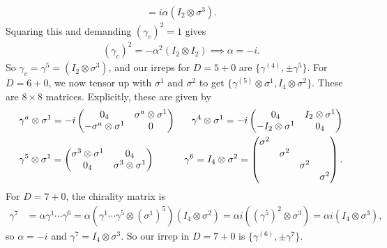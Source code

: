 \documentclass[11pt]{article}
\begin{document}
\begin{eexample}
\begin{align*}
        = i \alpha (I_2 \otimes \sigma^3).
    \end{align*}
    Squaring this and demanding $(\gamma_c)^2 = 1$ gives
    \begin{align*}
        (\gamma_c)^2 = - \alpha^2 (I_2 \otimes I_2) \implies \alpha = - i.
    \end{align*}
    So $\gamma_c = \gamma^5 = (I_2 \otimes \sigma^3)$, and our irreps
    for $D = 5 + 0$ are $\{ \gamma^{(4)}, \pm \gamma^5\}$.
    For $D = 6 + 0$, we now tensor up with $\sigma^1$ and $\sigma^2$ to get
    $\{ \gamma^{(5)} \otimes \sigma^1, I_4 \otimes \sigma^2 \}$.
    These are $8 \times 8$ matrices. Explicitly, these are given by
    \begin{align*}
        & \gamma^a \otimes \sigma^1 = -i \begin{pmatrix}
            0_4 & \sigma^a \otimes \sigma^1\\
            - \sigma^a \otimes \sigma^1 & 0
        \end{pmatrix}
        & \gamma^4 \otimes \sigma^1 = - i \begin{pmatrix}
            0_4 & I_2 \otimes \sigma^1\\
            - I_2 \otimes \sigma^1 & 0_4
        \end{pmatrix}\\
        & \gamma^5 \otimes \sigma^1 = \begin{pmatrix}
            \sigma^3 \otimes \sigma^1 & 0_4\\
            0_4 & \sigma^3 \otimes \sigma^1
        \end{pmatrix}
        & \gamma^6 = I_4 \otimes \sigma^2 = \begin{pmatrix}
            \sigma^2 & & &\\
             & \sigma^2 & &\\
             & & \sigma^2 & \\
             & & & \sigma^2
        \end{pmatrix}.
    \end{align*}
    For $D = 7 + 0$, the chirality matrix is
    \begin{align*}
        \gamma^7 & = \alpha \gamma^1 \cdots \gamma^6
        = \alpha (\gamma^1 \cdots \gamma^5 \otimes (\sigma^1)^5)(I_4 \otimes \sigma^2)
        = \alpha i((\gamma^5)^2 \otimes \sigma^3)
        = \boxed{\alpha i (I_4 \otimes \sigma^3),}
    \end{align*}
    so $\alpha = -i$ and $\gamma^7 = I_4 \otimes \sigma^3$.
    So our irrep in $D = 7 + 0$ is $\{ \gamma^{(6)}, \pm \gamma^7 \}$.

\end{eexample}
\end{document}
